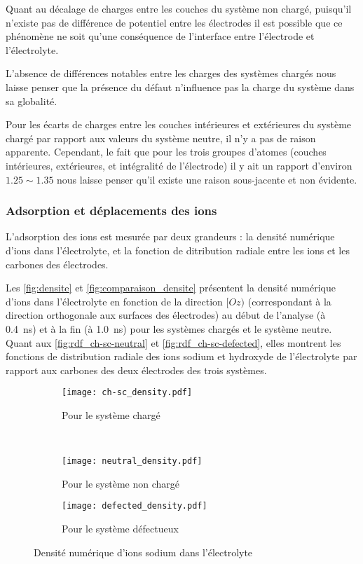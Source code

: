 Quant au décalage de charges entre les couches du système non chargé, puisqu'il n'existe pas de différence de potentiel entre les électrodes il est possible que ce phénomène ne soit qu'une conséquence de l'interface entre l'électrode et l'électrolyte.

L'absence de différences notables entre les charges des systèmes chargés nous laisse penser que la présence du défaut n'influence pas la charge du système dans sa globalité.

Pour les écarts de charges entre les couches intérieures et extérieures du système chargé par rapport aux valeurs du système neutre, il n'y a pas de raison apparente. Cependant, le fait que pour les trois groupes d'atomes (couches intérieures, extérieures, et intégralité de l'électrode) il y ait un rapport d'environ $\num{1.25}\sim \num{1.35}$ nous laisse penser qu'il existe une raison sous-jacente et non évidente.

    \subsubsection{Adsorption et déplacements des ions}

L'adsorption des ions est mesurée par deux grandeurs : la densité numérique d'ions dans l'électrolyte, et la fonction de ditribution radiale entre les ions et les carbones des électrodes.

Les \autoref{fig:densite} et \ref{fig:comparaison_densite} présentent la densité numérique d'ions dans l'électrolyte en fonction de la direction $[Oz)$ (correspondant à la direction orthogonale aux surfaces des électrodes) au début de l'analyse (à \qty{0.4}{\nano \second}) et à la fin (à \qty{1.0}{\nano \second}) pour les systèmes chargés et le système neutre.\\
Quant aux \autoref{fig:rdf_ch-sc-neutral} et \ref{fig:rdf_ch-sc-defected}, elles montrent les fonctions de distribution radiale des ions sodium et hydroxyde de l'électrolyte par rapport aux carbones des deux électrodes des trois systèmes.

\begin{figure}[h!]
    \centering
    \begin{subfigure}[t]{.49 \textwidth}
        \centering
        \texttt{[image: ch-sc\_density.pdf]}
        \caption{Pour le système chargé}
    \end{subfigure}%
    ~
    \begin{subfigure}[t]{.49 \textwidth}
        \centering
        \texttt{[image: neutral\_density.pdf]}
        \caption{Pour le système non chargé}
    \end{subfigure}

    \begin{subfigure}[t]{.49 \textwidth}
        \centering
        \texttt{[image: defected\_density.pdf]}
        \caption{Pour le système défectueux}
    \end{subfigure}
    \caption{Densité numérique d'ions sodium dans l'électrolyte}
    \label{fig:densite}
\end{figure}

